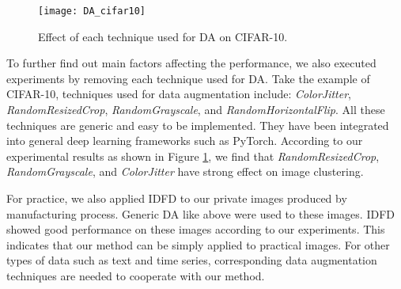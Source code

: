 \documentclass{article} \usepackage{iclr2021_conference,times}
\begin{document}
\begin{figure}[h]
  \centering
  \texttt{[image: DA\_cifar10]}
  \caption{Effect of each technique used for DA on CIFAR-10. } 
  \label{fig:da_effect}
\end{figure}


To further find out main factors affecting the performance, we also executed experiments by removing each technique used for DA. Take the example of CIFAR-10, techniques used for data augmentation include: {\it ColorJitter}, {\it RandomResizedCrop}, {\it RandomGrayscale}, and {\it RandomHorizontalFlip}. All these techniques are generic and easy to be implemented. They have been integrated into general deep learning frameworks such as PyTorch. According to our experimental results as shown in Figure \ref{fig:da_effect}, we find that {\it RandomResizedCrop}, {\it RandomGrayscale}, and {\it ColorJitter} have strong effect on image clustering.


For practice, we also applied IDFD to our private images produced by manufacturing process. Generic DA like above were used to these images. IDFD showed good performance on these images according to our experiments. This indicates that our method can be simply applied to practical images.
For other types of data such as text and time series, corresponding data augmentation techniques are needed to cooperate with our method.








 
\end{document}

